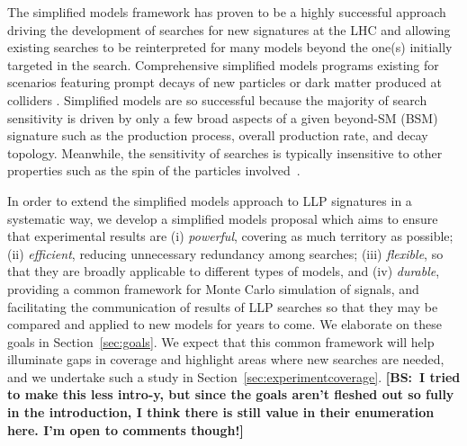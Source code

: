  The simplified models framework has proven to be a highly successful approach driving the development of  searches for new signatures at the LHC and allowing existing searches to be reinterpreted for many models beyond the one(s) initially targeted in the search. Comprehensive simplified models programs existing for scenarios featuring prompt decays of new particles \cite{ArkaniHamed:2005px,Knuteson:2006ha,ArkaniHamed:2007fw,Aaltonen:2007dg,Alwall:2008ag,Alwall:2008va,Alves:2011wf} or dark matter produced at colliders \cite{Petriello:2008pu,Dudas:2009uq,Goodman:2011jq,An:2012va,Frandsen:2012rk,Dreiner:2013vla,Cotta:2013jna,Abdallah:2015ter}.  Simplified models are so successful because the majority of search sensitivity is driven by only a few broad aspects of a given beyond-SM (BSM) signature such as the production process, overall production rate, and decay topology. Meanwhile, the sensitivity of searches is typically insensitive to other properties such as the spin of the particles involved~\cite{Edelhauser:2015ksa,Edelhauser:2014ena,Arina:2015uea,Kraml:2016eti}.


In order to extend the simplified models approach to LLP signatures in a systematic way, we develop a simplified models proposal which aims to ensure that experimental results are (i) {\em powerful}, covering as much territory as possible; (ii) {\em efficient}, reducing unnecessary redundancy among searches; (iii) {\em flexible}, so that they are broadly applicable to different types of models, and (iv) {\em durable}, providing a common framework for Monte Carlo simulation of signals, and facilitating the communication of results of LLP searches so that they may be compared and applied to new models for years to come. We elaborate on these goals in Section~\ref{sec:goals}.
We expect that this common framework will help illuminate gaps in coverage and highlight areas where new searches are needed, and we undertake such a study in Section~\ref{sec:experimentcoverage}. {\bf [BS:~I tried to make this less intro-y, but since the goals aren't fleshed out so fully in the introduction, I think there is still value in their enumeration here. I'm open to comments though!]}




